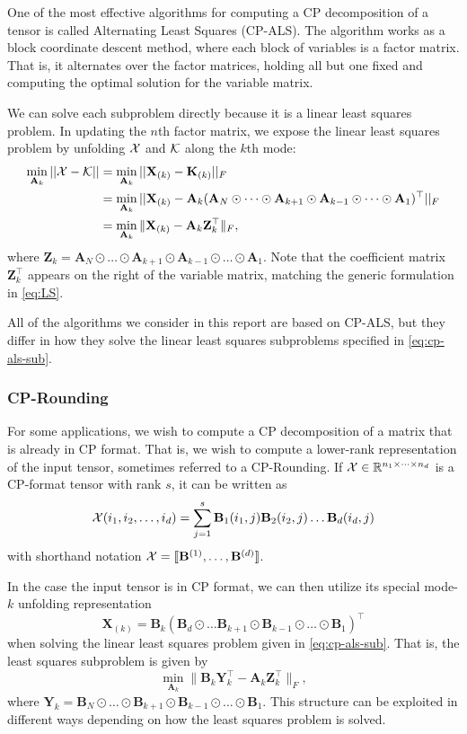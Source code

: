 \documentclass{article}
\newcommand{\mat}[1]{\mathbf{#1}}
\newcommand{\T}[2][]{#1{\mathbf{\cal{#2}}}} 						%
\begin{document}
One of the most effective algorithms for computing a CP decomposition of a tensor is called Alternating Least Squares (CP-ALS).
The algorithm works as a block coordinate descent method, where each block of variables is a factor matrix.
That is, it alternates over the factor matrices, holding all but one fixed and computing the optimal solution for the variable matrix.

We can solve each subproblem directly because it is a linear least squares problem.
In updating the $n$th factor matrix, we expose the linear least squares problem by unfolding $\T{X}$ and $\T{K}$ along the $k$th mode:
\begin{align}
\label{eq:cp-als-sub}
\min_{\mat{A}_k}||\T{X} - \T{K}|| &= \min_{\mat{A}_k}||\mat{X}_{(k)} - \mat{K}_{(k)}||_F \notag \\ 
&=  \min_{\mat{A}_k}||\mat{X}_{(k)} - \mat{A}_k(\mat{A}_N \odot \dots \odot \mat{A}_{k+1} \odot \mat{A}_{k-1} \odot \dots \odot \mat{A}_1)^\top||_F \notag \\ 
&=  \min_{\mat{A}_k}\|\mat{X}_{(k)}-\mat{A}_k\mat{Z}_k^\top\|_F,
\end{align}
where $\mat{Z}_k=\mat{A}_N \odot \dots \odot \mat{A}_{k+1} \odot \mat{A}_{k-1} \odot \dots \odot \mat{A}_1$.
Note that the coefficient matrix $\mat{Z}_k^\top$ appears on the right of the variable matrix, matching the generic formulation in \cref{eq:LS}.

All of the algorithms we consider in this report are based on CP-ALS, but they differ in how they solve the linear least squares subproblems specified in \cref{eq:cp-als-sub}.

\subsubsection{CP-Rounding}

For some applications, we wish to compute a CP decomposition of a matrix that is already in CP format.
That is, we wish to compute a lower-rank representation of the input tensor, sometimes referred to a CP-Rounding.
If $\T{X} \in \mathbb{R}^{n_1 \times \dots \times n_d}$ is a CP-format tensor with rank $s$, it can be written as 
$$\T{X}(i_1,i_2,\dots, i_d) = \sum^{s}_{j=1} \mat{B}_1(i_1,j)\mat{B}_2(i_2,j) \dots \mat{B}_d(i_d,j)$$
with shorthand notation $\T{X} = [\![\mat{B}^{(1)}, \dots ,\mat{B}^{(d)}]\!]$.

In the case the input tensor is in CP format, we can then utilize its special mode-$k$ unfolding representation 
$$\mat{X}_{(k)} = \mat{B}_k(\mat{B}_d \odot \dots \mat{B}_{k+1} \odot \mat{B}_{k-1} \odot \dots \odot \mat{B}_1)^\top$$
when solving the linear least squares problem given in \cref{eq:cp-als-sub}. 
That is, the least squares subproblem is given by 
\begin{equation}
\label{eq:cp-als-sub-ktensor}
\min_{\mat{A}_k}\|\mat{B}_{k}\mat{Y}_k^\top-\mat{A}_k\mat{Z}_k^\top\|_F,
\end{equation}
where $\mat{Y}_k = \mat{B}_N \odot \dots \odot \mat{B}_{k+1} \odot \mat{B}_{k-1} \odot \dots \odot \mat{B}_1$.
This structure can be exploited in different ways depending on how the least squares problem is solved.
\end{document}
